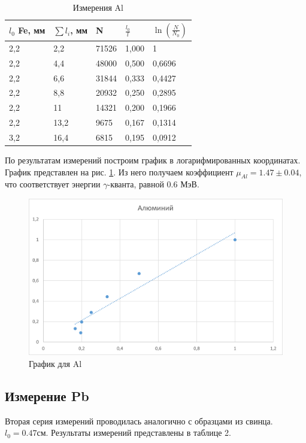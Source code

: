 \begin{table}[!ht]
    \centering
    \label{table:Al}
    \caption{Измерения Al}
    \begin{tabular}{|l|l|l|l|l|}
    \hline
        $l_0$ Fe, мм & $\sum l_i$, мм & N & $\frac {l_0}{l}$ & $\ln( \frac {N} {N_0} )$  \\ \hline
        2,2 & 2,2 & 71526 & 1,000 & 1  \\ \hline
        2,2 & 4,4 & 48000 & 0,500 & 0,6696  \\ \hline
        2,2 & 6,6 & 31844 & 0,333 & 0,4427  \\ \hline
        2,2 & 8,8 & 20932 & 0,250 & 0,2895  \\ \hline
        2,2 & 11 & 14321 & 0,200 & 0,1966  \\ \hline
        2,2 & 13,2 & 9675 & 0,167 & 0,1314  \\ \hline
        3,2 & 16,4 & 6815 & 0,195 & 0,0912  \\ \hline
    \end{tabular}
\end{table}

По результатам измерений построим график в логарифмированных координатах. График представлен на рис. \ref{fig:Al_plot}. Из него получаем коэффициент $\mu_{Al} = 1.47 \pm 0.04$, что соответствует энергии $\gamma$-кванта, равной 0.6 МэВ.

\begin{figure}[h]
    \centering
    \includegraphics[width=1\textwidth]{Al_plot.png}
    \caption{График для Al}
    \label{fig:Al_plot}
\end{figure}

\subsection{Измерение Pb}
Вторая серия измерений проводилась аналогично с образцами из свинца. $l_0 = 0.47\text{см}$. Результаты измерений представлены в таблице 2.

